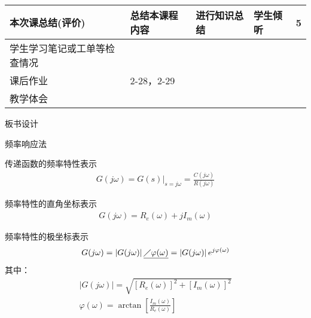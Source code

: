 {\begin{landscape}
\begin{longtable}{|m{10mm}|m{50mm}|m{50mm}|m{50mm}|m{15mm}|}
\centering 本次课总结(评价)&总结本课程内容 &进行知识总结 &学生倾听 &5 \\\hline
\centering 学生学习笔记或工单等检查情况&\multicolumn{4}{m{165mm}|}{\quad}\\\hline
\centering 课后作业&\multicolumn{4}{m{165mm}|}{2-28，2-29}\\\hline
\centering 教学体会&\multicolumn{4}{m{165mm}|}{\quad}\\
\end{longtable}

\end{landscape}
\clearpage
\begin{center}
{\huge 板书设计}
\end{center}
}
 \begin{frame}{频率响应法} 
 \begin{block}{传递函数的频率特性表示}
 \begin{eqnarray*}
 G(j\omega)=G(s)|_{s=j\omega}=\frac{C(j\omega)}{R(j\omega)}
 \end{eqnarray*}
 \end{block}
  \begin{block}{频率特性的直角坐标表示}
 \begin{eqnarray*}
 G(j\omega)=R_e(\omega)+jI_m(\omega)
 \end{eqnarray*}
 \end{block}
 \end{frame}
 \begin{frame}
 \begin{block}{频率特性的极坐标表示}
 \begin{eqnarray*}
 G(j\omega)=\left|G(j\omega)\right|\underline{\diagup\varphi(\omega)}=\left|G(j\omega)\right|e^{j\varphi(\omega)}
 \end{eqnarray*}
 其中：
 \begin{eqnarray*}
 \left|G(j\omega)\right|=\sqrt{[R_e(\omega)]^2+[I_m(\omega)]^2}\\
 \varphi(\omega)=\arctan\left[\frac{I_m(\omega)}{R_e(\omega)}\right]
 \end{eqnarray*}
 \end{block}
 \end{frame}
 
